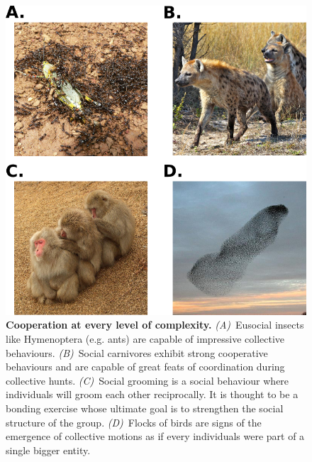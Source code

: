     \begin{figure}[hbt]
        \begin{center}
          \includegraphics[scale = 0.5]{fig/Intro/CooperationExamples.png}
          \caption{\textbf{Cooperation at every level of complexity.} {\em (A)}~Eusocial insects like Hymenoptera (e.g. ants) are capable of impressive collective behaviours. {\em (B)}~Social carnivores exhibit strong cooperative behaviours and are capable of great feats of coordination during collective hunts. {\em (C)}~Social grooming is a social behaviour where individuals will groom each other reciprocally. It is thought to be a bonding exercise whose ultimate goal is to strengthen the social structure of the group. {\em (D)}~Flocks of birds are signs of the emergence of collective motions as if every individuals were part of a single bigger entity.} 
          \label{fig:CooperationExamples}
        \end{center}
    \end{figure}

